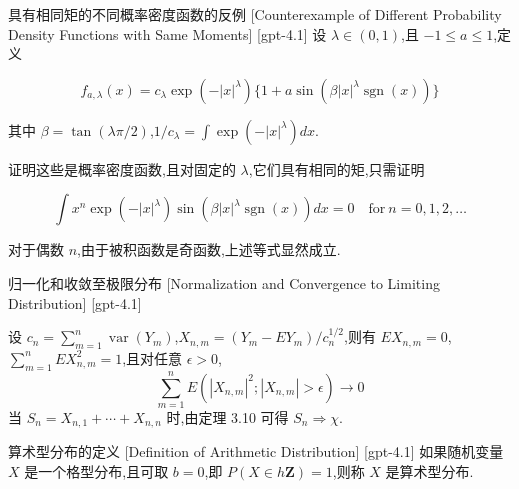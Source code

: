 \documentclass[UTF8]{ctexart}
\begin{document}
    \begin{cxmp}
        {具有相同矩的不同概率密度函数的反例}
        [Counterexample of Different Probability Density Functions with Same Moments]
        [gpt-4.1]
        设 $\lambda \in ( 0 , 1 )$,且 $-1 \leq a \leq 1$,定义

\[
f_{a, \lambda} ( x ) = c_{\lambda} \exp ( - | x |^{\lambda} ) \{ 1 + a \sin ( \beta | x |^{\lambda} \operatorname{sgn} ( x ) ) \}
\]

其中 $\beta = \tan ( \lambda \pi / 2 )$,$1 / c_{\lambda} = \int \exp ( - | x |^{\lambda} ) d x$.

证明这些是概率密度函数,且对固定的 $\lambda$,它们具有相同的矩,只需证明

\[
\int x^{n} \exp ( - | x |^{\lambda} ) \sin ( \beta | x |^{\lambda} \operatorname{sgn} ( x ) ) d x = 0 \quad \mathrm{for}~ n = 0 , 1 , 2 , \dots
\]

对于偶数 $n$,由于被积函数是奇函数,上述等式显然成立.

    \end{cxmp}
    
    
    
    \begin{thm}
        {归一化和收敛至极限分布}
        [Normalization and Convergence to Limiting Distribution]
        [gpt-4.1]
        
设 $c_n = \sum_{m=1}^{n} \operatorname{var}(Y_m)$,$X_{n, m} = (Y_m - E Y_m) / c_n^{1/2}$,则有 $E X_{n, m} = 0$,$\sum_{m=1}^{n} E X_{n, m}^2 = 1$,且对任意 $\epsilon > 0$,
\[
\sum_{m=1}^{n} E(|X_{n, m}|^2 ; |X_{n, m}| > \epsilon) \to 0
\]
当 $S_n = X_{n, 1} + \cdots + X_{n, n}$ 时,由定理 3.10 可得 $S_n \Rightarrow \chi$.

    \end{thm}
    
    
    
    \begin{dfn}
        {算术型分布的定义}
        [Definition of Arithmetic Distribution]
        [gpt-4.1]
        如果随机变量 $X$ 是一个格型分布,且可取 $b = 0$,即 $P(X \in h\mathbf{Z}) = 1$,则称 $X$ 是算术型分布.
    \end{dfn}
    
    
    
\end{document}
